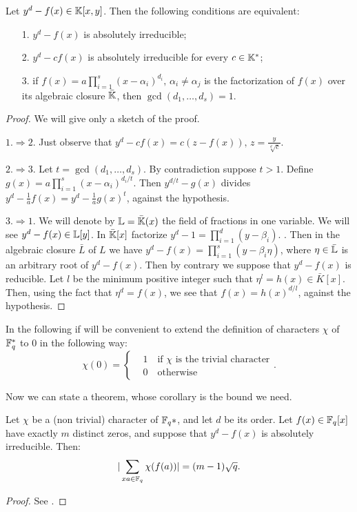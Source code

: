\begin{lemma}\label{tre}
	Let $y^d-f(x)\in {\mathbb K}[x,y]$. Then the following conditions are equivalent:
	\begin{itemize}
	\item[1.] $y^d-f(x)$ is absolutely irreducible;
	\item[2.] $y^d-cf(x)$ is absolutely irreducible for every $c \in {\mathbb K}^{*}$;
	\item[3.] if $f(x)=a \prod_{i=1}^s (x-\alpha_i)^{d_i}, \, \alpha_i \neq \alpha_j$ is the factorization of $f(x)$ over
	 its algebraic closure $\bar{{\mathbb K}}$, then $\gcd(d_1,\dots ,d_s)=1$.
	\end{itemize}
\begin{proof} We will give only a sketch of the proof.

$1. \Rightarrow 2.$ Just observe that $y^d-cf(x)=c(z-f(x)),\, z=\frac{y}{\sqrt[d]{c}}$.

$2. \Rightarrow 3.$ Let $t=\gcd(d_1,\dots ,d_s)$. By contradiction suppose $t > 1$.
Define $g(x)=a \prod_{i=1}^s (x-\alpha_i)^{d_i/t}$. Then $y^{d/t}-g(x)$ divides $y^d-\frac{1}{a}f(x)=y^d-\frac{1}{a}g(x)^t$,
against the hypothesis.

$3. \Rightarrow 1.$ We will denote by ${\mathbb L}=\bar{{\mathbb K}}(x)$ the field of fractions in one variable.
We will see $y^d-f(x) \in {\mathbb L}[y]$.
In $\bar{{\mathbb K}}[x]$ factorize $y^d-1=\prod_{i=1}^d (y-\beta_i)$.  .
Then in the algebraic closure $\bar{L}$ of $L$ we have $y^d-f(x)=\prod_{i=1}^{s}(y-\beta_i \eta)$,
where $\eta \in \bar{{\mathbb L}}$ is an arbitrary root of $y^d-f(x)$.
Then by contrary we suppose that $y^d-f(x)$ is reducible. Let $l$ be the minimum positive integer such that
$\eta^l=h(x)\in \bar{K}[x]$. Then, using the fact that $\eta^d=f(x)$, we see that $f(x)=h(x)^{d/l}$, against the hypothesis. 
\end{proof}
\end{lemma}
In the following if will be  convenient to extend the definition of characters $\chi$ of ${\mathbb F}_q^{*}$
to 0 in the following way:
\begin{equation*}
	\chi (0)=\begin{cases}&1\quad \text{if $\chi$ is the trivial character}\\ &0 \quad\text{otherwise} \end{cases}.
\end{equation*}

Now we can state a theorem, whose corollary is the bound we need.
\begin{theorem}
Let $\chi$ be a (non trivial) character of ${\mathbb F}_q{*}$, and let $d$ be its order. Let $f(x) \in {\mathbb F}_q[x]$ have exactly
$m$ distinct zeros, and suppose that $y^d-f(x)$ is absolutely irreducible. Then:
\begin{equation}
	\vert \sum_{xa \in {\mathbb F}_q} \chi (f(a)) \vert=(m-1)\sqrt{q}. 
\end{equation}
\begin{proof}
	See \cite{schmidt1976equations}.
\end{proof}
\end{theorem}

